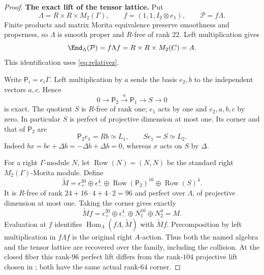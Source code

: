 \begin{proof}
\par\smallskip\noindent\textbf{The exact lift of the tensor lattice.}\quad
Put
\[
 \Lambda=R\times R\times M_2(\Gamma),\qquad
 f=(1,1,I_2\otimes e_1),\qquad \mathcal P=f\Lambda.
\]
Finite products and matrix Morita equivalence preserve
smoothness and properness, so $\Lambda$ is smooth proper
and $R$-free of rank $22$. Left multiplication gives
\[
 \End_\Lambda(\mathcal P)=f\Lambda f
       =R\times R\times M_2(C)=A.
\]
This identification uses \eqref{eq:relativez}.

Write $\mathsf P_i=e_i\Gamma$. Left multiplication by
$a$ sends the basis $e_2,b$ to the independent vectors
$a,c$. Hence
\begin{equation}\label{eq:relativeS}
 0\longrightarrow\mathsf P_2\xrightarrow{a}\mathsf P_1
      \longrightarrow S\longrightarrow0
\end{equation}
is exact. The quotient $S$ is $R$-free of rank one;
$e_1$ acts by one and $e_2,a,b,c$ by zero.
In particular $S$ is perfect of projective dimension at
most one. Its corner and that of $\mathsf P_2$ are
\[
 \mathsf P_2e_1=Rb\simeq L_1,\qquad Se_1=S\simeq L_2.
\]
Indeed $bx=bc+\Delta b=-\Delta b+\Delta b=0$,
whereas $x$ acts on $S$ by $\Delta$.

For a right $\Gamma$-module $N$, let
$\operatorname{Row}(N)=(N,N)$ be the standard right
$M_2(\Gamma)$-Morita module. Define
\begin{equation}\label{eq:relativelift}
 \widetilde M=\epsilon_+^{20}\oplus\epsilon_-^4
       \oplus\operatorname{Row}(\mathsf P_2)^{16}
       \oplus\operatorname{Row}(S)^4.
\end{equation}
It is $R$-free of rank $24+16\cdot4+4\cdot2=96$
and perfect over $\Lambda$, of projective dimension
at most one. Taking the corner gives exactly
\[
 \widetilde M f=
 \epsilon_+^{20}\oplus\epsilon_-^4\oplus N_1^{16}
       \oplus N_2^4=M.
\]
Evaluation at $f$ identifies
$\operatorname{Hom}_\Lambda(f\Lambda,\widetilde M)$
with $\widetilde M f$. Precomposition by left multiplication
in $f\Lambda f$ is the original right $A$-action.
Thus both the named algebra and the tensor lattice are
recovered over the family, including the collision.
At the closed fiber this rank-$96$ perfect lift differs
from the rank-$104$ projective lift chosen in ;
both have the same actual rank-$64$ corner.


\end{proof}
